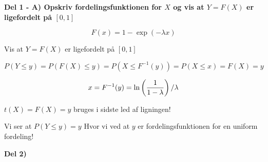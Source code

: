 \textbf{Del 1 - A) Opskriv fordelingsfunktionen for $X$ og vis at $Y=F(X)$ er ligefordelt på $[0,1]$}

\begin{equation}
    F(x) = 1 - \exp(- \lambda x)
\end{equation}

Vis at $Y=F(X)$ er ligefordelt på $[0,1]$

\begin{equation}
    P(Y \leq y) = P(F(X) \leq y) = P(X \leq F^{-1}(y)) = P(X \leq x) = F(X) = y
\end{equation}

\begin{equation}
    x = F^{-1} (y) =  \ln \left( \frac{1}{1- \lambda } \right) / \lambda
\end{equation}

$t(X) = F(X) = y$ bruges i sidste led af ligningen!

Vi ser at $P(Y \leq y) = y$ Hvor vi ved at $y$ er fordelingsfunktionen for en uniform fordeling! 

\textbf{Del 2)}


